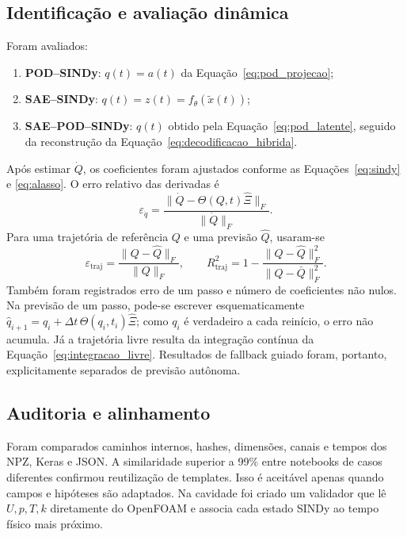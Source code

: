 \documentclass[12pt,a4paper]{article}
\begin{document}
\subsection{Identificação e avaliação dinâmica}
Foram avaliados:
\begin{enumerate}
\item \textbf{POD--SINDy}: $q(t)=a(t)$ da Equação~\eqref{eq:pod_projecao};
\item \textbf{SAE--SINDy}: $q(t)=z(t)=f_\theta(\widetilde x(t))$;
\item \textbf{SAE--POD--SINDy}: $q(t)$ obtido pela Equação~\eqref{eq:pod_latente}, seguido da reconstrução da Equação~\eqref{eq:decodificacao_hibrida}.
\end{enumerate}
Após estimar $\dot Q$, os coeficientes foram ajustados conforme as Equações~\eqref{eq:sindy} e \eqref{eq:alasso}. O erro relativo das derivadas é
\begin{equation}
\varepsilon_{\dot q}=\frac{\lVert\dot Q-\Theta(Q,t)\widehat\Xi\rVert_F}{\lVert\dot Q\rVert_F}.
\label{eq:erro_derivada}
\end{equation}
Para uma trajetória de referência $Q$ e uma previsão $\widehat Q$, usaram-se
\begin{equation}
\varepsilon_{\mathrm{traj}}=\frac{\lVert Q-\widehat Q\rVert_F}{\lVert Q\rVert_F},
\qquad
R^2_{\mathrm{traj}}=1-\frac{\lVert Q-\widehat Q\rVert_F^2}{\lVert Q-\bar Q\rVert_F^2}.
\label{eq:metricas_trajetoria}
\end{equation}
Também foram registrados erro de um passo e número de coeficientes não nulos. Na previsão de um passo, pode-se escrever esquematicamente $\widehat q_{i+1}=q_i+\Delta t\,\Theta(q_i,t_i)\widehat\Xi$; como $q_i$ é verdadeiro a cada reinício, o erro não acumula. Já a trajetória livre resulta da integração contínua da Equação~\eqref{eq:integracao_livre}. Resultados de fallback guiado foram, portanto, explicitamente separados de previsão autônoma.

\subsection{Auditoria e alinhamento}
Foram comparados caminhos internos, hashes, dimensões, canais e tempos dos NPZ, Keras e JSON. A similaridade superior a 99\% entre notebooks de casos diferentes confirmou reutilização de templates. Isso é aceitável apenas quando campos e hipóteses são adaptados. Na cavidade foi criado um validador que lê $U,p,T,k$ diretamente do OpenFOAM e associa cada estado SINDy ao tempo físico mais próximo.
\end{document}
